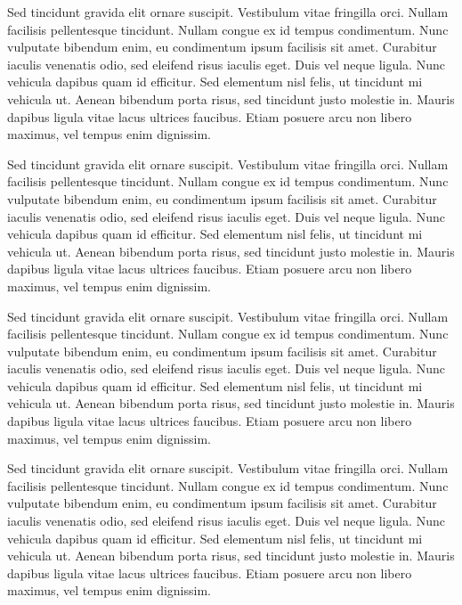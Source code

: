 Sed tincidunt gravida elit ornare suscipit. Vestibulum vitae fringilla orci. Nullam facilisis pellentesque tincidunt. Nullam congue ex id tempus condimentum. Nunc vulputate bibendum enim, eu condimentum ipsum facilisis sit amet. Curabitur iaculis venenatis odio, sed eleifend risus iaculis eget. Duis vel neque ligula. Nunc vehicula dapibus quam id efficitur. Sed elementum nisl felis, ut tincidunt mi vehicula ut. Aenean bibendum porta risus, sed tincidunt justo molestie in. Mauris dapibus ligula vitae lacus ultrices faucibus. Etiam posuere arcu non libero maximus, vel tempus enim dignissim. \par
Sed tincidunt gravida elit ornare suscipit. Vestibulum vitae fringilla orci. Nullam facilisis pellentesque tincidunt. Nullam congue ex id tempus condimentum. Nunc vulputate bibendum enim, eu condimentum ipsum facilisis sit amet. Curabitur iaculis venenatis odio, sed eleifend risus iaculis eget. Duis vel neque ligula. Nunc vehicula dapibus quam id efficitur. Sed elementum nisl felis, ut tincidunt mi vehicula ut. Aenean bibendum porta risus, sed tincidunt justo molestie in. Mauris dapibus ligula vitae lacus ultrices faucibus. Etiam posuere arcu non libero maximus, vel tempus enim dignissim. \par
Sed tincidunt gravida elit ornare suscipit. Vestibulum vitae fringilla orci. Nullam facilisis pellentesque tincidunt. Nullam congue ex id tempus condimentum. Nunc vulputate bibendum enim, eu condimentum ipsum facilisis sit amet. Curabitur iaculis venenatis odio, sed eleifend risus iaculis eget. Duis vel neque ligula. Nunc vehicula dapibus quam id efficitur. Sed elementum nisl felis, ut tincidunt mi vehicula ut. Aenean bibendum porta risus, sed tincidunt justo molestie in. Mauris dapibus ligula vitae lacus ultrices faucibus. Etiam posuere arcu non libero maximus, vel tempus enim dignissim. \par
Sed tincidunt gravida elit ornare suscipit. Vestibulum vitae fringilla orci. Nullam facilisis pellentesque tincidunt. Nullam congue ex id tempus condimentum. Nunc vulputate bibendum enim, eu condimentum ipsum facilisis sit amet. Curabitur iaculis venenatis odio, sed eleifend risus iaculis eget. Duis vel neque ligula. Nunc vehicula dapibus quam id efficitur. Sed elementum nisl felis, ut tincidunt mi vehicula ut. Aenean bibendum porta risus, sed tincidunt justo molestie in. Mauris dapibus ligula vitae lacus ultrices faucibus. Etiam posuere arcu non libero maximus, vel tempus enim dignissim. \par
